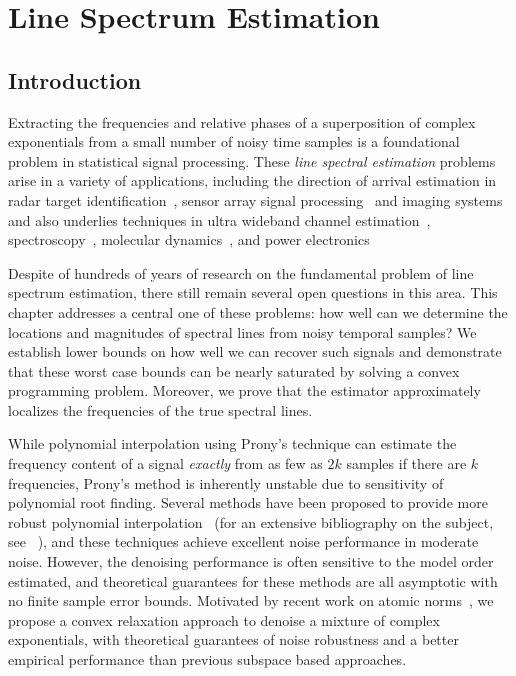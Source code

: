 \chapter{Line Spectrum Estimation}
\label{chap:linespect}

\section{Introduction}

Extracting the frequencies and relative phases of a superposition of complex
exponentials from a small number of noisy time samples is a foundational problem
in statistical signal processing. These \emph{line spectral estimation} problems
arise in a variety of applications, including the direction of arrival
estimation in radar target identification~\cite{radar}, sensor array signal
processing~\cite{arrays} and imaging systems~\cite{imaging} and also underlies
techniques in ultra wideband channel estimation~\cite{uwb},
spectroscopy~\cite{nmr}, molecular dynamics~\cite{andrade2012}, and power
electronics~\cite{power}


Despite of hundreds of years of research on the fundamental problem of line
spectrum estimation, there still remain several open questions in this area.
This chapter addresses a central one of these problems: how well can we
determine the locations and magnitudes of spectral lines from noisy temporal
samples? We establish lower bounds on how well we can recover such signals and
demonstrate that these worst case bounds can be nearly saturated by solving a
convex programming problem. Moreover, we prove that the estimator approximately
localizes the frequencies of the true spectral lines.

While polynomial interpolation using Prony's technique can estimate the
frequency content of a signal \emph{exactly} from as few as $2k$ samples if
there are $k$ frequencies, Prony's method is inherently unstable due to
sensitivity of polynomial root finding. Several methods have been proposed to
provide more robust polynomial interpolation~\cite{music,esprit,hua02} (for an
extensive bibliography on the subject, see ~\cite{stoica93}), and these
techniques achieve excellent noise performance in moderate noise. However, the
denoising performance is often sensitive to the model order estimated, and
theoretical guarantees for these methods are all asymptotic with no finite
sample error bounds. Motivated by recent work on atomic norms~\cite{crpw}, we
propose a convex relaxation approach to denoise a mixture of complex
exponentials, with theoretical guarantees of noise robustness and a better
empirical performance than previous subspace based approaches.

